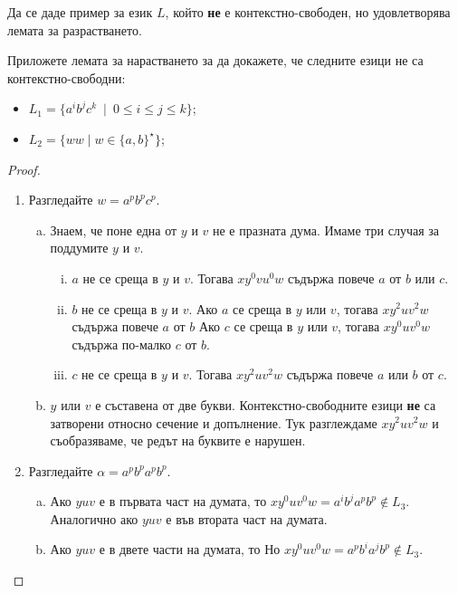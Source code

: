 \begin{problem}
  Да се даде пример за език $L$, който {\bf не} е контекстно-свободен, но удовлетворява
  лемата за разрастването.
\end{problem}

\begin{example}
  Приложете лемата за нарастването за да докажете, че 
  следните езици не са контекстно-свободни:
  \begin{itemize}
  \item
    $L_1 = \{a^ib^jc^k\ \mid\ 0 \leq i \leq j \leq k\}$;
  \item
    $L_2 = \{ww\mid w\in \{a,b\}^\star\}$;
  \end{itemize}
\end{example}
\begin{proof}
  \begin{enumerate}[1)]
  \item
    Разгледайте $w = a^pb^pc^p$.
    \begin{enumerate}[a)]
    \item
      Знаем, че поне една от $y$ и $v$ не е празната дума.
      Имаме три случая за поддумите $y$ и $v$.
      \begin{enumerate}[i)]
      \item
        $a$ не се среща в $y$ и $v$.
        Тогава $xy^0vu^0w$ съдържа повече $a$ от $b$ или $c$.
      \item
        $b$ не се среща в $y$ и $v$.
        Ако $a$ се среща в $y$ или $v$, тогава $xy^2uv^2w$ съдържа повече $a$ от $b$
        Ако $c$ се среща в $y$ или $v$, тогава $xy^0uv^0w$ съдържа по-малко $c$ от $b$.
      \item
        $c$ не се среща в $y$ и $v$.
        Тогава $xy^2uv^2w$ съдържа повече $a$ или $b$ от $c$.
      \end{enumerate}      
    \item
      $y$ или $v$ е съставена от две букви.  Контекстно-свободните езици {\bf не} са затворени относно сечение и допълнение.
      Тук разглеждаме $xy^2uv^2w$ и съобразяваме, че редът на буквите е нарушен.
    \end{enumerate}
  \item
    Разгледайте $\alpha = a^pb^pa^pb^p$.
    \begin{enumerate}[a)]
    \item
      Ако $yuv$ е в първата част на думата, то 
      $xy^0uv^0w = a^ib^ja^pb^p \not\in L_3$.
      Аналогично ако $yuv$ е във втората част на думата.
    \item
      Ако $yuv$ е в двете части на думата, то 
      Но $xy^0uv^0w = a^pb^ia^jb^p \not\in L_3$.
    \end{enumerate}    
  \end{enumerate}
\end{proof}


